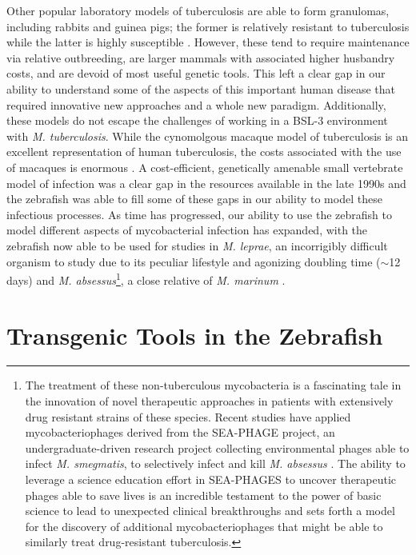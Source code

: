 Other popular laboratory models of tuberculosis are able to form granulomas, including rabbits and guinea pigs; the former is relatively resistant to tuberculosis while the latter is highly susceptible \citep{Clark2014, Dorman2004, Heppleston1949}. However, these tend to require maintenance via relative outbreeding, are larger mammals with associated higher husbandry costs, and are devoid of most useful genetic tools. This left a clear gap in our ability to understand some of the aspects of this important human disease that required innovative new approaches and a whole new paradigm. Additionally, these models do not escape the challenges of working in a BSL\hyp{}3 environment with \textit{M. tuberculosis}. While the cynomolgous macaque model of tuberculosis is an excellent representation of human tuberculosis, the costs associated with the use of macaques is enormous \citep{Pena2015}. A cost\hyp{}efficient, genetically amenable small vertebrate model of infection was a clear gap in the resources available in the late 1990s and the zebrafish was able to fill some of these gaps in our ability to model these infectious processes. As time has progressed, our ability to use the zebrafish to model different aspects of mycobacterial infection has expanded, with the zebrafish now able to be used for studies in \textit{M. leprae}, an incorrigibly difficult organism to study due to its peculiar lifestyle and agonizing doubling time ($\sim$12 days) \citep{Madigan2017} and \textit{M. absessus}\footnote{The treatment of these non-tuberculous mycobacteria is a fascinating tale in the innovation of novel therapeutic approaches in patients with extensively drug resistant strains of these species. Recent studies have applied mycobacteriophages derived from the SEA-PHAGE project, an undergraduate-driven research project collecting environmental phages able to infect \textit{M. smegmatis}, to selectively infect and kill \textit{M. absessus} \citep{Jordan2014, Dedrick2022, Dedrick2021, Dedrick2019}. The ability to leverage a science education effort in SEA-PHAGES to uncover therapeutic phages able to save lives is an incredible testament to the power of basic science to lead to unexpected clinical breakthroughs and sets forth a model for the discovery of additional mycobacteriophages that might be able to similarly treat drug-resistant tuberculosis.}, a close relative of \textit{M. marinum} \citep{Halloum2016, Stinear2008, Bryant2016}.

\section{Transgenic Tools in the Zebrafish}\label{transgenics}

